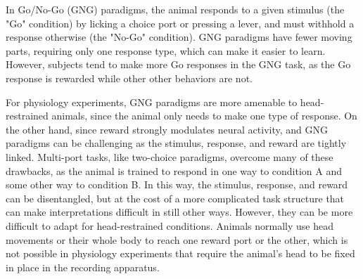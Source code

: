 In Go/No-Go (GNG) paradigms, the animal responds to a given stimulus (the "Go" condition) by licking a choice port or pressing a lever, and must withhold a response otherwise (the "No-Go" condition). GNG paradigms have fewer moving parts, requiring only one response type, which can make it easier to learn. However, subjects tend to make more Go responses in the GNG task, as the Go response is rewarded while other other behaviors are not\cite{REFREF}. 

For physiology experiments, GNG paradigms are more amenable to head-restrained animals, since the animal only needs to make one type of response. On the other hand, since reward strongly modulates neural activity, and GNG paradigms can be challenging as the stimulus, response, and reward are tightly linked\cite{REFREF}. Multi-port tasks, like two-choice paradigms, overcome many of these drawbacks, as the animal is trained to respond in one way to condition A and some other way to condition B. In this way, the stimulus, response, and reward can be disentangled, but at the cost of a more complicated task structure that can make interpretations difficult in still other ways. However, they can be more difficult to adapt for head-restrained conditions. Animals normally use head movements or their whole body to reach one reward port or the other\cite{REFREF}, which is not possible in physiology experiments that require the animal's head to be fixed in place in the recording apparatus. 






